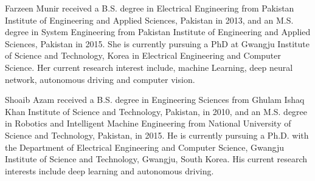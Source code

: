 \documentclass[journal]{IEEEtran}
\begin{document}
\ifCLASSOPTIONcaptionsoff
\newpage
\fi





































\newpage 
\begin{IEEEbiography}{Farzeen Munir} received a B.S. degree in Electrical Engineering from Pakistan Institute of Engineering and Applied Sciences, Pakistan in 2013,
and an M.S. degree in System Engineering from Pakistan Institute of Engineering
and Applied Sciences, Pakistan in 2015. She is currently pursuing a PhD
at Gwangju Institute of Science and Technology, Korea in Electrical
Engineering and Computer Science. Her current research interest include,
machine Learning, deep neural network, autonomous driving and computer vision.
\end{IEEEbiography}

\begin{IEEEbiography}{Shoaib Azam} received a B.S. degree in Engineering Sciences from Ghulam Ishaq Khan Institute of Science and Technology, Pakistan, in 2010, and an M.S. degree in Robotics and Intelligent Machine Engineering from National
University of Science and Technology, Pakistan, in 2015. He is currently
pursuing a Ph.D. with the Department of Electrical Engineering and
Computer Science, Gwangju Institute of Science and Technology, Gwangju,
South Korea. His current research interests include deep learning and autonomous driving.
\end{IEEEbiography}
\end{document}
